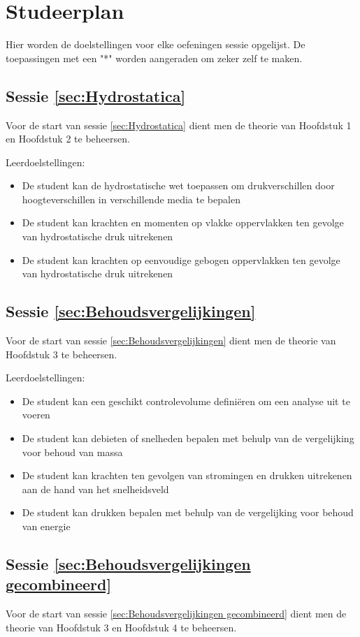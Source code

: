 \chapter{Studeerplan}
Hier worden de doelstellingen voor elke oefeningen sessie opgelijst. De toepassingen met een "*" worden aangeraden om zeker zelf te maken.
	\section*{Sessie \ref{sec:Hydrostatica}}
Voor de start van sessie \ref{sec:Hydrostatica} dient men de theorie van Hoofdstuk 1 en Hoofdstuk 2 te beheersen.

Leerdoelstellingen:
\begin{itemize}
	\item De student kan de hydrostatische wet toepassen om drukverschillen door hoogteverschillen in verschillende media te bepalen
	\item De student kan krachten en momenten op vlakke oppervlakken ten gevolge van hydrostatische druk uitrekenen
	\item De student kan krachten op eenvoudige gebogen oppervlakken ten gevolge van hydrostatische druk uitrekenen
\end{itemize}
	
	\section*{Sessie \ref{sec:Behoudsvergelijkingen}}
Voor de start van sessie \ref{sec:Behoudsvergelijkingen} dient men de theorie van Hoofdstuk 3 te beheersen.

Leerdoelstellingen:
\begin{itemize}
	\item De student kan een geschikt controlevolume definiëren om een analyse uit te voeren
	\item De student kan debieten of snelheden bepalen met behulp van de vergelijking voor behoud van massa
	\item De student kan krachten ten gevolgen van stromingen en drukken uitrekenen aan de hand van het snelheidsveld
	\item De student kan drukken bepalen met behulp van de vergelijking voor behoud van energie
\end{itemize}

	\section*{Sessie \ref{sec:Behoudsvergelijkingen gecombineerd}}
Voor de start van sessie \ref{sec:Behoudsvergelijkingen gecombineerd} dient men de theorie van Hoofdstuk 3 en Hoofdstuk 4 te beheersen.

